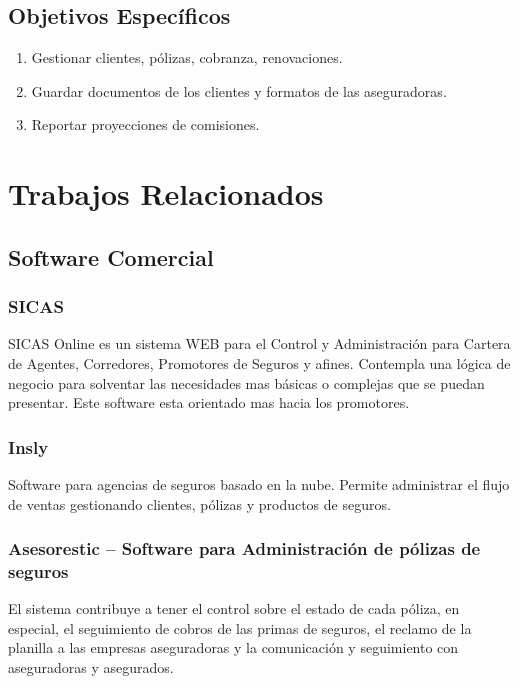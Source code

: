 \subsection*{Objetivos Específicos}
\begin{enumerate}
	\item Gestionar clientes, pólizas, cobranza, renovaciones.
	\item Guardar documentos de los clientes y formatos de las aseguradoras.
	\item Reportar proyecciones de comisiones.
\end{enumerate}

\section{Trabajos Relacionados}
\subsection*{Software Comercial}
\subsubsection*{SICAS \cite{www:sicas}} 

SICAS Online es un sistema WEB para el Control y Administración para Cartera de Agentes, Corredores, Promotores de Seguros y afines. Contempla una lógica de negocio para solventar las necesidades mas básicas o complejas que se puedan presentar. Este software esta orientado mas hacia los promotores.

\subsubsection*{Insly \cite{www:insly}}

Software para agencias de seguros basado en la nube. Permite administrar el flujo de ventas gestionando clientes, pólizas y productos de seguros.

\subsubsection*{Asesorestic – Software para Administración de pólizas de seguros \cite{www:asesorestic}}

El sistema contribuye a tener el control sobre el estado de cada póliza, en especial, el seguimiento de cobros de las primas de seguros, el reclamo de la planilla a las empresas aseguradoras y la comunicación y seguimiento con aseguradoras y asegurados.

